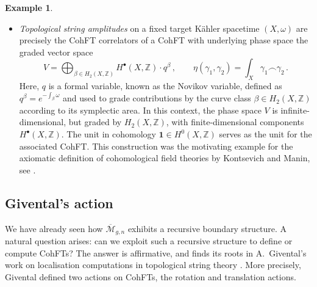 \documentclass[11pt,reqno]{amsart}
\numberwithin{equation}{section}
\newcommand{\mb}[1]{\mathbb{#1}}
\newcommand{\mc}[1]{\mathcal{#1}}
\newcommand{\Z}{\mb{Z}}
\newcommand{\M}{\mc{M}}
\newcommand{\Mbar}{\overline{\M}}
\theoremstyle{plain}
\theoremstyle{definition}
\newtheorem{example}[theorem]{Example}
\begin{document}
\begin{example}
\begin{itemize}
    \item
    \emph{Topological string amplitudes} on a fixed target Kähler spacetime $(X,\omega)$ are precisely the CohFT correlators of a CohFT with underlying phase space the graded vector space
    \begin{equation}
      V = \bigoplus_{\beta \in H_2(X,\Z)} H^{\bullet}(X,\Z) \cdot q^{\beta} \,,
      \qquad
      \eta(\gamma_1,\gamma_2) = \int_{X} \gamma_1 \frown \gamma_2 \,.
    \end{equation}
    Here, $q$ is a formal variable, known as the Novikov variable, defined as $q^\beta = e^{- \int_\beta \omega}$ and used to grade contributions by the curve class $\beta \in H_2(X,\Z)$ according to its symplectic area. In this context, the phase space $V$ is infinite-dimensional, but graded by $H_2(X,\Z)$, with finite-dimensional components $H^{\bullet}(X,\Z)$. The unit in cohomology $\bm{1} \in H^0(X,\Z)$ serves as the unit for the associated CohFT. This construction was the motivating example for the axiomatic definition of cohomological field theories by Kontsevich and Manin, see \cite{KM94}. %
  \end{itemize}
\end{example}

\subsection{Givental's action}
\label{subsec:Givental}
We have already seen how $\Mbar_{g,n}$ exhibits a recursive boundary structure. A natural question arises: can we exploit such a recursive structure to define or compute CohFTs? The answer is affirmative, and finds its roots in A.~Givental's work \cite{Giv01a,Giv01b} on localisation computations in topological string theory \cite{GP99}. More precisely, Givental defined two actions on CohFTs, the rotation and translation actions.

\end{document}
